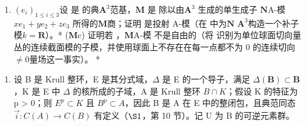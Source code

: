 \begin{enumerate}
\def\labelenumi{(\alph{enumi})}
\setcounter{enumi}{1}
\tightlist
\item
  \((e_i)_{1 \leq i \leq 3}\)设  是  的典\(\mathbf{A}^3\)范基，\(\mathbf{M}\) 是  除以由\(\mathbf{A}^3\)  生成的单生成子 \(\mathbf{N}\)A-模 \(xe_1 + ye_2 + ze_3\) 所得的\(\mathbf{M}\)商；证明  是投射 A-模（在  中为\(\mathbf{N}\)  \(\mathbf{A}^3\)构造一个补子模\(k = \mathbf{R}\)）。* (\(\mathbf{M}\)c) 证明若 ，\(\mathbf{M}\)A-模  不是自由的（将  识别为单位球面切向量丛的连续截面模的子模，并使用球面上不存在在每一点都不为 0 的连续切向\(\neq 0\)量场这一事实）。 *
\end{enumerate}

\begin{enumerate}
\def\labelenumi{\arabic{enumi}.}
\setcounter{enumi}{22}
\tightlist
\item
  设 B 是 Krull 整环，E 是其分式域，\(\Delta\) 是 E 的一个导子，满足 \(\Delta(\mathbf{B}) \subset \mathbf{B}\)，K 是 E 中 \(\Delta\) 的核所成的子域，A 是 Krull 整环 \(B \cap K\)；假设 K 的特征为 p \textgreater{} 0；则 \(E^{p} \subset K\) 且 \(B^{p} \subset A\)，因此 B 是 A 在 E 中的整闭包，且典范同态 \(\vec{i}: C(A) \to C(B)\) 有定义（\(\S 1\)，第 10 节）。记 U 为 B 的可逆元素群。
\end{enumerate}

